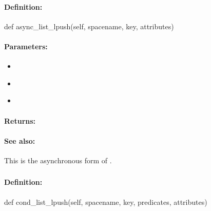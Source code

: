 \paragraph{Definition:}
\begin{pythoncode}
def async_list_lpush(self, spacename, key, attributes)
\end{pythoncode}

\paragraph{Parameters:}
\begin{itemize}[noitemsep]
\item {}\\

\item {}\\

\item {}\\

\end{itemize}

\paragraph{Returns:}


\paragraph{See also:}  This is the asynchronous form of .

\pagebreak
\subsubsection{}
\label{api:python:cond_list_lpush}


\paragraph{Definition:}
\begin{pythoncode}
def cond_list_lpush(self, spacename, key, predicates, attributes)
\end{pythoncode}

